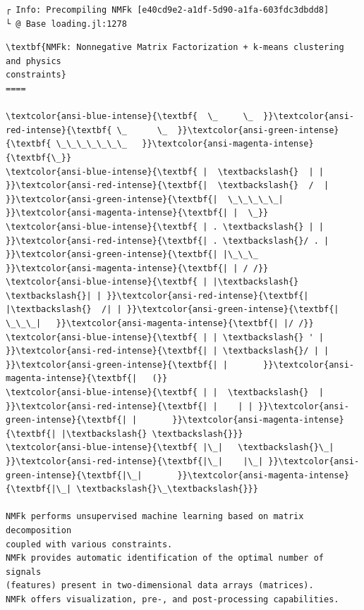 \documentclass[11pt]{article}
\begin{document}
    \begin{Verbatim}[commandchars=\\\{\}]
┌ Info: Precompiling NMFk [e40cd9e2-a1df-5d90-a1fa-603fdc3dbdd8]
└ @ Base loading.jl:1278
    \end{Verbatim}

    \begin{Verbatim}[commandchars=\\\{\}]
\textbf{NMFk: Nonnegative Matrix Factorization + k-means clustering and physics
constraints}
====

\textcolor{ansi-blue-intense}{\textbf{  \_     \_  }}\textcolor{ansi-red-intense}{\textbf{ \_      \_  }}\textcolor{ansi-green-intense}{\textbf{ \_\_\_\_\_\_\_   }}\textcolor{ansi-magenta-intense}{\textbf{\_}}
\textcolor{ansi-blue-intense}{\textbf{ |  \textbackslash{}  | | }}\textcolor{ansi-red-intense}{\textbf{|  \textbackslash{}  /  | }}\textcolor{ansi-green-intense}{\textbf{|  \_\_\_\_\_| }}\textcolor{ansi-magenta-intense}{\textbf{| |  \_}}
\textcolor{ansi-blue-intense}{\textbf{ | . \textbackslash{} | | }}\textcolor{ansi-red-intense}{\textbf{| . \textbackslash{}/ . | }}\textcolor{ansi-green-intense}{\textbf{| |\_\_\_    }}\textcolor{ansi-magenta-intense}{\textbf{| | / /}}
\textcolor{ansi-blue-intense}{\textbf{ | |\textbackslash{} \textbackslash{}| | }}\textcolor{ansi-red-intense}{\textbf{| |\textbackslash{}  /| | }}\textcolor{ansi-green-intense}{\textbf{|  \_\_\_|   }}\textcolor{ansi-magenta-intense}{\textbf{| |/ /}}
\textcolor{ansi-blue-intense}{\textbf{ | | \textbackslash{} ' | }}\textcolor{ansi-red-intense}{\textbf{| | \textbackslash{}/ | | }}\textcolor{ansi-green-intense}{\textbf{| |       }}\textcolor{ansi-magenta-intense}{\textbf{|   (}}
\textcolor{ansi-blue-intense}{\textbf{ | |  \textbackslash{}  | }}\textcolor{ansi-red-intense}{\textbf{| |    | | }}\textcolor{ansi-green-intense}{\textbf{| |       }}\textcolor{ansi-magenta-intense}{\textbf{| |\textbackslash{} \textbackslash{}}}
\textcolor{ansi-blue-intense}{\textbf{ |\_|   \textbackslash{}\_| }}\textcolor{ansi-red-intense}{\textbf{|\_|    |\_| }}\textcolor{ansi-green-intense}{\textbf{|\_|       }}\textcolor{ansi-magenta-intense}{\textbf{|\_| \textbackslash{}\_\textbackslash{}}}

NMFk performs unsupervised machine learning based on matrix decomposition
coupled with various constraints.
NMFk provides automatic identification of the optimal number of signals
(features) present in two-dimensional data arrays (matrices).
NMFk offers visualization, pre-, and post-processing capabilities.
    \end{Verbatim}
\end{document}

